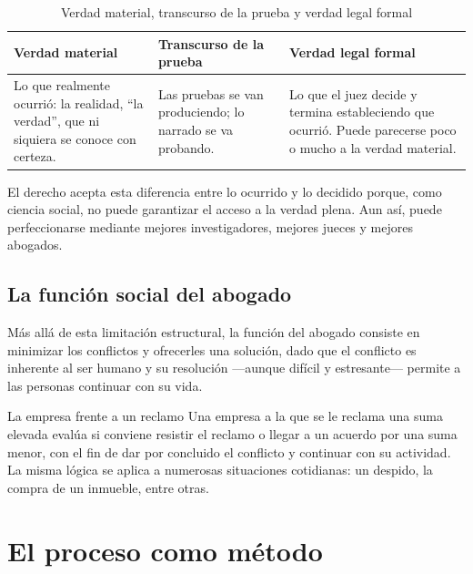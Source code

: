 \documentclass[12pt,oneside]{book}
\begin{document}
\begin{table}[H]
\centering
\caption{Verdad material, transcurso de la prueba y verdad legal formal}
\begin{tabularx}{\textwidth}{>{\raggedright\arraybackslash}X >{\raggedright\arraybackslash}X >{\raggedright\arraybackslash}X}
\toprule
\textbf{Verdad material} & \textbf{Transcurso de la prueba} & \textbf{Verdad legal formal} \\
\midrule
Lo que realmente ocurrió: la realidad, ``la verdad'', que ni siquiera se conoce con certeza. & Las pruebas se van produciendo; lo narrado se va probando. & Lo que el juez decide y termina estableciendo que ocurrió. Puede parecerse poco o mucho a la verdad material. \\
\bottomrule
\end{tabularx}
\end{table}

\begin{important}
El derecho acepta esta diferencia entre lo ocurrido y lo decidido porque, como ciencia social, no puede garantizar el acceso a la verdad plena. Aun así, puede perfeccionarse mediante mejores investigadores, mejores jueces y mejores abogados.
\end{important}

\subsection{La función social del abogado}

Más allá de esta limitación estructural, la función del abogado consiste en minimizar los conflictos y ofrecerles una solución, dado que el conflicto es inherente al ser humano y su resolución —aunque difícil y estresante— permite a las personas continuar con su vida.

\begin{example}{La empresa frente a un reclamo}
Una empresa a la que se le reclama una suma elevada evalúa si conviene resistir el reclamo o llegar a un acuerdo por una suma menor, con el fin de dar por concluido el conflicto y continuar con su actividad. La misma lógica se aplica a numerosas situaciones cotidianas: un despido, la compra de un inmueble, entre otras.
\end{example}

\section{El proceso como método}
\end{document}
